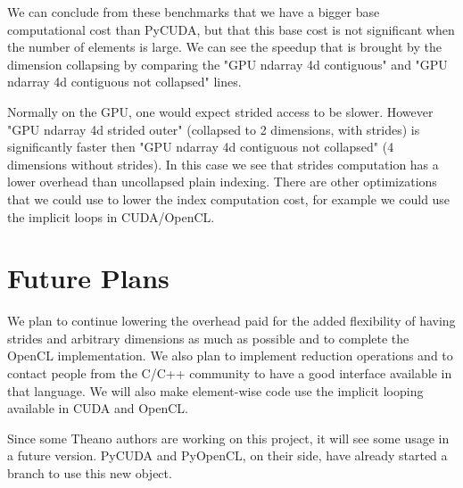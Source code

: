 \documentclass{article} %
\begin{document}
We can conclude from these benchmarks that we have a bigger base computational cost than PyCUDA, but that this base cost is not significant when the number of elements is large.
We can see the speedup that is brought by the dimension collapsing by comparing the "GPU ndarray 4d contiguous" and "GPU ndarray 4d contiguous not collapsed" lines.

Normally on the GPU, one would expect strided access to be slower.
However "GPU ndarray 4d strided outer" (collapsed to 2 dimensions, with strides) is significantly faster then "GPU ndarray 4d contiguous not collapsed" (4 dimensions without strides).
In this case we see that strides computation has a lower overhead than uncollapsed plain indexing.
There are other optimizations that we could use to lower the index computation cost, for example we could use the implicit loops in CUDA/OpenCL.


\section{Future Plans}

We plan to continue lowering the overhead paid for the added flexibility of having strides and arbitrary dimensions 
as much as possible and to complete the OpenCL implementation.
We also plan to implement reduction operations and to contact people from the C/C++ community to have a good interface available in that language.
We will also make element-wise code use the implicit looping available in CUDA and OpenCL.

Since some Theano authors are working on this project, it will see some usage in a future version. PyCUDA and PyOpenCL, on their side, have already started a branch to use this new object.
\end{document}
